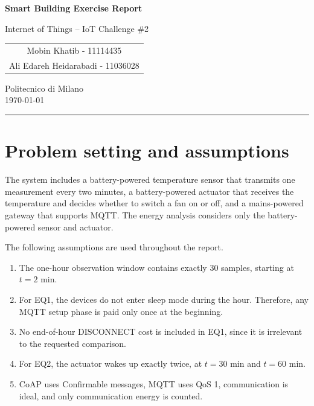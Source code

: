 \documentclass[11pt,a4paper]{article}
\newcommand{\course}{Internet of Things -- IoT Challenge \#2}
\newcommand{\studentA}{Mobin Khatib - 11114435}
\newcommand{\studentB}{Ali Edareh Heidarabadi - 11036028}
\begin{document}
\begin{center}
    {\LARGE\bfseries Smart Building Exercise Report\par}
    \vspace{0.35em}
    {\large \course\par}
    \vspace{0.75em}
    \begin{tabular}{c}
        \studentA\\
        \studentB
    \end{tabular}
    \vspace{0.45em}

    Politecnico di Milano\\
    \today
\end{center}

\vspace{0.8em}
\hrule
\vspace{0.9em}

\begin{abstract}
This report solves Part 2 of the challenge, which concerns the communication energy consumed by a battery-powered temperature sensor and a battery-powered actuator in a smart-building scenario. The devices may communicate either directly with CoAP or through an MQTT gateway. The first exercise question compares the total communication energy over one hour, while the second question asks for the preferred protocol when the actuator wakes up only once every 30 minutes.
\end{abstract}

\section{Problem setting and assumptions}
The system includes a battery-powered temperature sensor that transmits one measurement every two minutes, a battery-powered actuator that receives the temperature and decides whether to switch a fan on or off, and a mains-powered gateway that supports MQTT. The energy analysis considers only the battery-powered sensor and actuator.

The following assumptions are used throughout the report.
\begin{enumerate}[leftmargin=1.5em,itemsep=2pt]
    \item The one-hour observation window contains exactly 30 samples, starting at \(t = 2\) min.
    \item For EQ1, the devices do not enter sleep mode during the hour. Therefore, any MQTT setup phase is paid only once at the beginning.
    \item No end-of-hour DISCONNECT cost is included in EQ1, since it is irrelevant to the requested comparison.
    \item For EQ2, the actuator wakes up exactly twice, at \(t = 30\) min and \(t = 60\) min.
    \item CoAP uses Confirmable messages, MQTT uses QoS 1, communication is ideal, and only communication energy is counted.
\end{enumerate}
\end{document}
